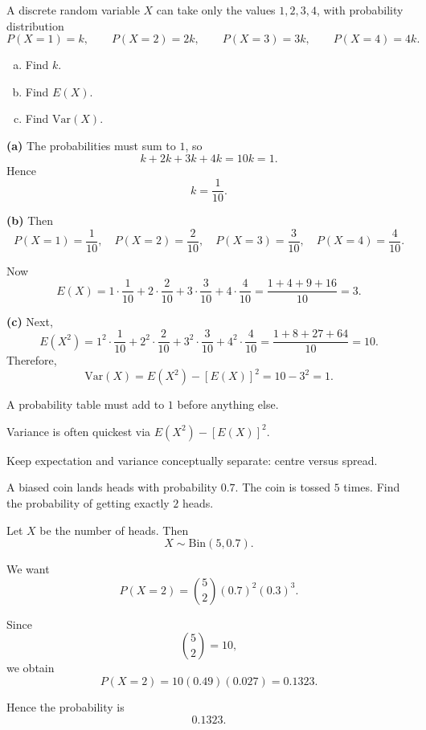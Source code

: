 \begin{problem}
A discrete random variable $X$ can take only the values $1,2,3,4$, with probability distribution
\[
P(X=1)=k,\qquad P(X=2)=2k,\qquad P(X=3)=3k,\qquad P(X=4)=4k.
\]
\begin{enumerate}[(a)]
  \item Find $k$.
  \item Find $E(X)$.
  \item Find $\mathrm{Var}(X)$.
\end{enumerate}
\end{problem}

\begin{solution}
\textbf{(a)} The probabilities must sum to $1$, so
\[
k+2k+3k+4k=10k=1.
\]
Hence
\[
k=\frac1{10}.
\]

\textbf{(b)} Then
\[
P(X=1)=\frac1{10},\quad
P(X=2)=\frac2{10},\quad
P(X=3)=\frac3{10},\quad
P(X=4)=\frac4{10}.
\]

Now
\[
E(X)=1\cdot \frac1{10}+2\cdot \frac2{10}+3\cdot \frac3{10}+4\cdot \frac4{10}
=\frac{1+4+9+16}{10}=3.
\]

\textbf{(c)} Next,
\[
E(X^2)=1^2\cdot \frac1{10}+2^2\cdot \frac2{10}+3^2\cdot \frac3{10}+4^2\cdot \frac4{10}
=\frac{1+8+27+64}{10}=10.
\]
Therefore,
\[
\mathrm{Var}(X)=E(X^2)-[E(X)]^2=10-3^2=1.
\]
\end{solution}

\begin{takeaways}
\item A probability table must add to $1$ before anything else.
\item Variance is often quickest via $E(X^2)-[E(X)]^2$.
\item Keep expectation and variance conceptually separate: centre versus spread.
\end{takeaways}

\begin{problem}
A biased coin lands heads with probability $0.7$. The coin is tossed $5$ times. Find the probability of getting exactly $2$ heads.
\end{problem}

\begin{solution}
Let $X$ be the number of heads. Then
\[
X\sim \mathrm{Bin}(5,0.7).
\]

We want
\[
P(X=2)=\binom52(0.7)^2(0.3)^3.
\]

Since
\[
\binom52=10,
\]
we obtain
\[
P(X=2)=10(0.49)(0.027)=0.1323.
\]

Hence the probability is
\[
\boxed{0.1323}.
\]
\end{solution}

